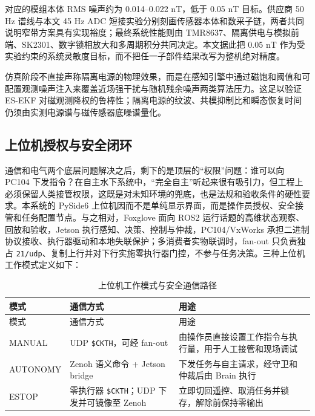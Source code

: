 对应的模组本体 RMS 噪声约为 0.014--0.022 nT，低于 0.05 nT 目标。供应商 50 Hz 谱线与本文 45 Hz ADC 短接实验分别刻画传感器本体和数采子链，两者共同说明窄带方案具有实现裕度；最终系统性能则由 TMR8637、隔离供电与模拟前端、SK2301、数字锁相放大和多周期积分共同决定。本文据此把 0.05 nT 作为受实验约束的系统灵敏度目标，而不把任一子部件结果改写为整机绝对精度。

仿真阶段不直接声称隔离电源的物理效果，而是在感知引擎中通过磁饱和阈值和可配置观测噪声注入来覆盖近场强干扰与随机残余噪声两类算法压力。这足以验证 ES-EKF 对磁观测降权的鲁棒性；隔离电源的纹波、共模抑制比和瞬态恢复时间仍须由实测电源谱与磁传感器底噪谱量化。

\subsection{上位机授权与安全闭环}\label{sec:ch02-2-5-3}

通信和电气两个底层问题解决之后，剩下的是顶层的``权限''问题：谁可以向 PC104 下发指令？在自主水下系统中，``完全自主''听起来很有吸引力，但工程上必须保留人类接管权限，这既是对未知环境的兜底，也是法规和验收条件的硬性要求。本系统的 PySide6 上位机因而不是单纯显示界面，而是操作员授权、安全接管和任务配置节点。与之相对，Foxglove 面向 ROS2 运行话题的高维状态观察、回放和验收，Jetson 执行感知、决策、控制与仲裁，PC104/VxWorks 承担二进制协议接收、执行器驱动和本地失联保护；多消费者实物联调时，fan-out 只负责独占 \texttt{21/udp}、复制上行并对下行实施零执行器门控，不参与任务决策。三种上位机工作模式定义如下：

\begin{longtable}[]{@{}
  >{\raggedright\arraybackslash}p{}
  >{\raggedright\arraybackslash}p{}
  >{\raggedright\arraybackslash}p{}@{}}
\caption{上位机工作模式与安全通信路径}\label{tab:ch02-modes}\tabularnewline
\toprule\noalign{}
模式 & 通信方式 & 用途 \\
\midrule\noalign{}
\endfirsthead
\toprule\noalign{}
模式 & 通信方式 & 用途 \\
\midrule\noalign{}
\endhead
\bottomrule\noalign{}
\endlastfoot
MANUAL & UDP \texttt{\$CKTH}，可经 fan-out & 由操作员直接设置工作指令与执行量，用于人工接管和现场调试 \\
AUTONOMY & Zenoh 语义命令 + Jetson bridge & 下发任务与自主请求，经守卫和仲裁后由 Brain 执行 \\
ESTOP & 零执行器 \texttt{\$CKTH}；UDP 下发并可镜像至 Zenoh & 立即切回遥控、取消任务并锁存，解除前保持零输出 \\
\end{longtable}


